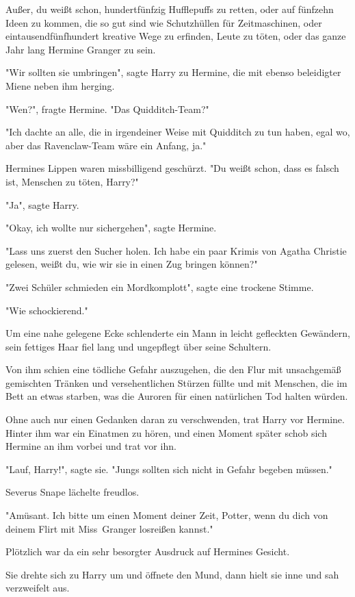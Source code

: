 {Außer, du weißt schon, hundertfünfzig Hufflepuffs zu retten, oder auf fünfzehn Ideen zu kommen, die so gut sind wie Schutzhüllen für Zeitmaschinen, oder eintausendfünfhundert kreative Wege zu erfinden, Leute zu töten, oder das ganze Jahr lang Hermine Granger zu sein.

"Wir sollten sie umbringen", sagte Harry zu Hermine, die mit ebenso beleidigter Miene neben ihm herging.

"Wen?", fragte Hermine. "Das Quidditch-Team?"

"Ich dachte an alle, die in irgendeiner Weise mit Quidditch zu tun haben, egal wo, aber das Ravenclaw-Team wäre ein Anfang, ja."

Hermines Lippen waren missbilligend geschürzt. "Du weißt schon, dass es falsch ist, Menschen zu töten, Harry?"

"Ja", sagte Harry.

"Okay, ich wollte nur sichergehen", sagte Hermine.

"Lass uns zuerst den Sucher holen. Ich habe ein paar Krimis von Agatha Christie gelesen, weißt du, wie wir sie in einen Zug bringen können?"

"Zwei Schüler schmieden ein Mordkomplott", sagte eine trockene Stimme.

"Wie schockierend."

Um eine nahe gelegene Ecke schlenderte ein Mann in leicht gefleckten Gewändern, sein fettiges Haar fiel lang und ungepflegt über seine Schultern.

Von ihm schien eine tödliche Gefahr auszugehen, die den Flur mit unsachgemäß gemischten Tränken und versehentlichen Stürzen füllte und mit Menschen, die im Bett an etwas starben, was die Auroren für einen natürlichen Tod halten würden.

Ohne auch nur einen Gedanken daran zu verschwenden, trat Harry vor Hermine. Hinter ihm war ein Einatmen zu hören, und einen Moment später schob sich Hermine an ihm vorbei und trat vor ihn.

"Lauf, Harry!", sagte sie. "Jungs sollten sich nicht in Gefahr begeben müssen."

Severus Snape lächelte freudlos.

"Amüsant. Ich bitte um einen Moment deiner Zeit, Potter, wenn du dich von deinem Flirt mit Miss~Granger losreißen kannst."

Plötzlich war da ein sehr besorgter Ausdruck auf Hermines Gesicht.

Sie drehte sich zu Harry um und öffnete den Mund, dann hielt sie inne und sah verzweifelt aus.

}
